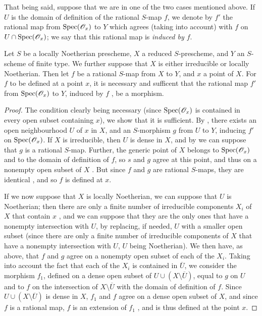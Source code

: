 That being said, suppose that we are in one of the two cases mentioned above.
If $U$ is the domain of definition of the rational $S$-map $f$, we denote by $f'$ the rational map from ${\mathop{\mathrm{Spec}}\nolimits}(\mathscr{O}_x)$ to $Y$ which agrees (taking  into account) with $f$ on $U\cap{\mathop{\mathrm{Spec}}\nolimits}(\mathscr{O}_x)$; we say that this rational map is \emph{induced by $f$}.

\begin{prop}[7.2.9]
\label{1.7.2.9}
Let $S$ be a locally Noetherian prescheme, $X$ a reduced $S$-prescheme, and $Y$ an $S$-scheme of finite type.
We further suppose that $X$ is either irreducible or locally Noetherian.
Then let $f$ be a rational $S$-map from $X$ to $Y$, and $x$ a point of $X$.
For $f$ to be defined at a point $x$, it is necessary and sufficent that the rational map $f'$ from ${\mathop{\mathrm{Spec}}\nolimits}(\mathscr{O}_x)$ to $Y$, induced by $f$ , be a morphism.
\end{prop}

\begin{proof}
\label{proof-1.7.2.9}
The condition clearly being necessary (since ${\mathop{\mathrm{Spec}}\nolimits}(\mathscr{O}_x)$ is contained in every open subset containing $x$), we show that it is sufficient.
By , there exists an open neighbourhood $U$ of $x$ in $X$, and an $S$-morphism $g$ from $U$ to $Y$, inducing $f'$ on ${\mathop{\mathrm{Spec}}\nolimits}(\mathscr{O}_x)$.
If $X$ is irreducible, then $U$ is dense in $X$, and by  we can suppose that $g$ is a rational $S$-map.
Further, the generic point of $X$ belongs to ${\mathop{\mathrm{Spec}}\nolimits}(\mathscr{O}_x)$ and to the domain of definition of $f$, so $s$ and $g$ agree at this point, and thus on a nonempty open subset of $X$ .
But since $f$ and $g$ are rational $S$-maps, they are identical , and so $f$ is defined at $x$.

If we now suppose that $X$ is locally Noetherian, we can suppose that $U$ is Noetherian; then there are only a finite number of irreducible components $X_i$ of $X$ that contain $x$ , and we can suppose that they are the only ones that have a nonempty intersection with $U$, by replacing, if needed, $U$ with a smaller open subset (since there are only a finite number of irreducible components of $X$ that have a nonempty intersection with $U$, $U$ being Noetherian).
We then have, as above, that $f$ and $g$ agree on a nonempty open subset of each of the $X_i$.
Taking into account the fact that each of the $X_i$ is contained in $\overline{U}$, we consider the morphism $f_1$, defined on a dense open subset of $U\cup(X\setminus\overline{U})$, equal to $g$ on $U$ and to $f$ on the intersection of $X\setminus\overline{U}$ with the domain of definition of $f$.
Since $U\cup(X\setminus\overline{U})$ is dense in $X$, $f_1$ and $f$ agree on a dense open subset of $X$, and since $f$ is a rational map, $f$ is an extension of $f_1$ , and is thus defined at the point $x$.
\end{proof}

